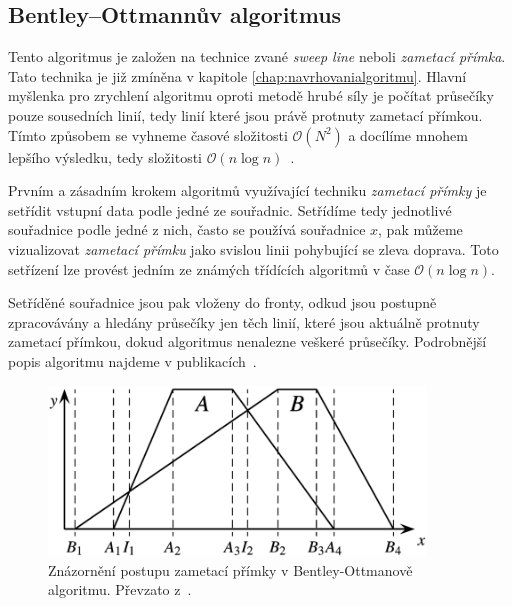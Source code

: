 \subsection{Bentley–Ottmannův algoritmus}
Tento algoritmus je založen na technice zvané \textit{sweep line} neboli \textit{zametací přímka}. Tato technika je již zmíněna v kapitole \ref{chap:navrhovanialgoritmu}. Hlavní myšlenka pro zrychlení algoritmu oproti metodě hrubé síly je počítat průsečíky pouze sousedních linií, tedy linií které jsou právě protnuty zametací přímkou. Tímto způsobem se vyhneme časové složitosti $\mathcal{O}(N^2)$ a docílíme mnohem lepšího výsledku, tedy složitosti $\mathcal{O}(n\log{}n)$~\cite{bentley1979algorithms}.

Prvním a zásadním krokem algoritmů využívající techniku \textit{zametací přímky} je setřídit vstupní data podle jedné ze souřadnic. Setřídíme tedy jednotlivé souřadnice podle jedné z nich, často se používá souřadnice $x$, pak můžeme vizualizovat \textit{zametací přímku} jako svislou linii pohybující se zleva doprava. Toto setřízení lze provést jedním ze známých třídících algoritmů v čase $\mathcal{O}(n\log{}n)$.

	Setříděné souřadnice jsou pak vloženy do fronty, odkud jsou postupně zpracovávány a hledány průsečíky jen těch linií, které jsou aktuálně protnuty zametací přímkou, dokud algoritmus nenalezne veškeré průsečíky. Podrobnější popis algoritmu najdeme v publikacích~\cite{coupland, bentley1979algorithms}.
	
\begin{figure}[h]
  \centering
  \includegraphics[width=10cm]{./pictures/5/Bentley-Ottmann-plane-sweep-algorithm.png}
  \caption{Znázornění postupu zametací přímky v Bentley-Ottmanově algoritmu. Převzato z~\citep{coupland}.}
  \label{fig:5-bentley_ottman}
\end{figure}



